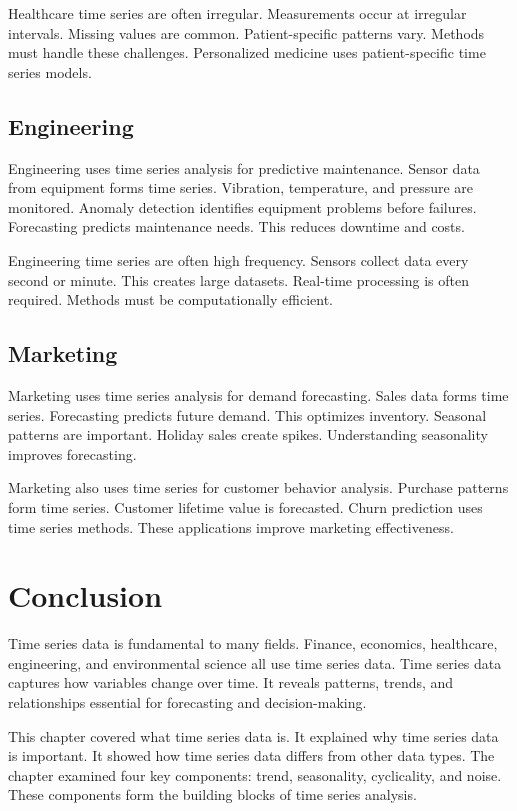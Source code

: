 Healthcare time series are often irregular. Measurements occur at irregular intervals. Missing values are common. Patient-specific patterns vary. Methods must handle these challenges. Personalized medicine uses patient-specific time series models.

\subsection{Engineering}

Engineering uses time series analysis for predictive maintenance. Sensor data from equipment forms time series. Vibration, temperature, and pressure are monitored. Anomaly detection identifies equipment problems before failures. Forecasting predicts maintenance needs. This reduces downtime and costs.

Engineering time series are often high frequency. Sensors collect data every second or minute. This creates large datasets. Real-time processing is often required. Methods must be computationally efficient.

\subsection{Marketing}

Marketing uses time series analysis for demand forecasting. Sales data forms time series. Forecasting predicts future demand. This optimizes inventory. Seasonal patterns are important. Holiday sales create spikes. Understanding seasonality improves forecasting.

Marketing also uses time series for customer behavior analysis. Purchase patterns form time series. Customer lifetime value is forecasted. Churn prediction uses time series methods. These applications improve marketing effectiveness.



\section{Conclusion}

Time series data is fundamental to many fields. Finance, economics, healthcare, engineering, and environmental science all use time series data. Time series data captures how variables change over time. It reveals patterns, trends, and relationships essential for forecasting and decision-making.

This chapter covered what time series data is. It explained why time series data is important. It showed how time series data differs from other data types. The chapter examined four key components: trend, seasonality, cyclicality, and noise. These components form the building blocks of time series analysis.

